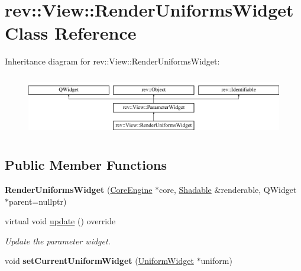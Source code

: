 \hypertarget{classrev_1_1_view_1_1_render_uniforms_widget}{}\section{rev\+::View\+::Render\+Uniforms\+Widget Class Reference}
\label{classrev_1_1_view_1_1_render_uniforms_widget}
Inheritance diagram for rev\+::View\+::Render\+Uniforms\+Widget\+:\begin{figure}[H]
\begin{center}
\leavevmode
\includegraphics[height=2.705314cm]{classrev_1_1_view_1_1_render_uniforms_widget}
\end{center}
\end{figure}
\subsection*{Public Member Functions}
\begin{DoxyCompactItemize}
\item 
\mbox{\label{classrev_1_1_view_1_1_render_uniforms_widget_a4468a5ed25870ea162bf89268e36e30f}} 
{\bfseries Render\+Uniforms\+Widget} (\mbox{\hyperlink{classrev_1_1_core_engine}{Core\+Engine}} $\ast$core, \mbox{\hyperlink{classrev_1_1_shadable}{Shadable}} \&renderable, Q\+Widget $\ast$parent=nullptr)
\item 
\mbox{\label{classrev_1_1_view_1_1_render_uniforms_widget_a665930fc34db86f1be03723a44c7e337}} 
virtual void \mbox{\hyperlink{classrev_1_1_view_1_1_render_uniforms_widget_a665930fc34db86f1be03723a44c7e337}{update}} () override
\begin{DoxyCompactList}\small\item\em Update the parameter widget. \end{DoxyCompactList}\item 
\mbox{\label{classrev_1_1_view_1_1_render_uniforms_widget_a6d5287a4b9e15c5120509bf1d0b2aa8e}} 
void {\bfseries set\+Current\+Uniform\+Widget} (\mbox{\hyperlink{classrev_1_1_view_1_1_uniform_widget}{Uniform\+Widget}} $\ast$uniform)
\end{DoxyCompactItemize}
